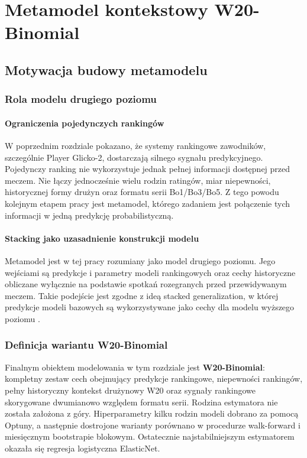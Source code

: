 \chapter{Metamodel kontekstowy W20-Binomial}

\section{Motywacja budowy metamodelu}

\subsection{Rola modelu drugiego poziomu}

\subsubsection{Ograniczenia pojedynczych rankingów}

W poprzednim rozdziale pokazano, że systemy rankingowe zawodników, szczególnie Player Glicko-2,
dostarczają silnego sygnału predykcyjnego. Pojedynczy ranking nie wykorzystuje jednak pełnej
informacji dostępnej przed meczem. Nie łączy jednocześnie wielu rodzin ratingów, miar niepewności,
historycznej formy drużyn oraz formatu serii Bo1/Bo3/Bo5. Z tego powodu kolejnym etapem pracy jest
metamodel, którego zadaniem jest połączenie tych informacji w jedną predykcję probabilistyczną.

\subsubsection{Stacking jako uzasadnienie konstrukcji modelu}

Metamodel jest w tej pracy rozumiany jako model drugiego poziomu. Jego wejściami są predykcje i
parametry modeli rankingowych oraz cechy historyczne obliczane wyłącznie na podstawie spotkań
rozegranych przed przewidywanym meczem. Takie podejście jest zgodne z ideą stacked generalization, w
której predykcje modeli bazowych są wykorzystywane jako cechy dla modelu wyższego poziomu
\parencite{wolpert1992,breiman1996stacked}.

\subsection{Definicja wariantu W20-Binomial}

Finalnym obiektem modelowania w tym rozdziale jest \textbf{W20-Binomial}: kompletny zestaw cech
obejmujący predykcje rankingowe, niepewności rankingów, pełny historyczny kontekst drużynowy W20
oraz sygnały rankingowe skorygowane dwumianowo względem formatu serii. Rodzina estymatora nie
została założona z góry. Hiperparametry kilku rodzin modeli dobrano za pomocą Optuny, a następnie
dostrojone warianty porównano w procedurze walk-forward i miesięcznym bootstrapie blokowym.
Ostatecznie najstabilniejszym estymatorem okazała się regresja logistyczna ElasticNet.

